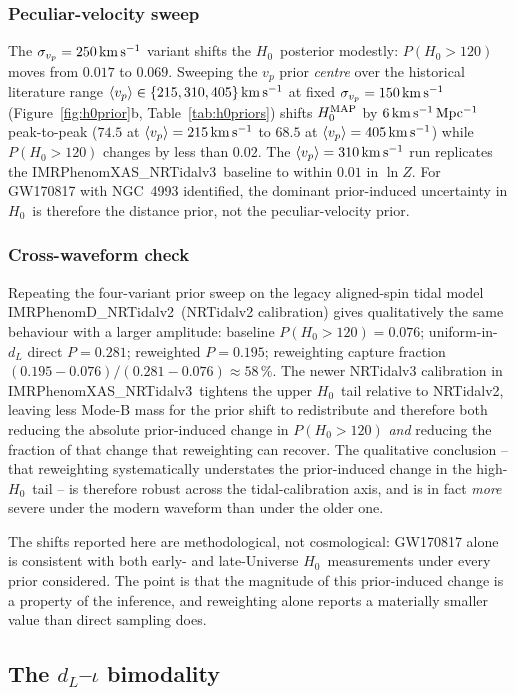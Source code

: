 \documentclass[usenatbib]{mnras}
\newcommand{\kmsmpc}{\ensuremath{\,\rm km\,s^{-1}\,Mpc^{-1}}\xspace}
\newcommand{\kms}{\ensuremath{\,\rm km\,s^{-1}}\xspace}
\newcommand{\hzero}{\ensuremath{H_{0}}\xspace}
\newcommand{\sigmavp}{\ensuremath{\sigma_{v_p}}\xspace}
\newcommand{\IMR}{IMRPhenomD\_NRTidalv2\xspace}
\newcommand{\IMRX}{IMRPhenomXAS\_NRTidalv3\xspace}
\begin{document}
\subsubsection{Peculiar-velocity sweep} The $\sigmavp=250\kms$ variant shifts the \hzero\ posterior modestly: $P(\hzero>120)$ moves from $0.017$ to $0.069$. Sweeping the $v_{p}$ prior \emph{centre} over the historical literature range $\langle v_{p}\rangle\in\{215, 310, 405\}\kms$ at fixed $\sigmavp=150\kms$ (Figure~\ref{fig:h0prior}b, Table~\ref{tab:h0priors}) shifts $\hzero^{\rm MAP}$ by $6\kmsmpc$ peak-to-peak ($74.5$ at $\langle v_{p}\rangle=215\kms$ to $68.5$ at $\langle v_{p}\rangle=405\kms$) while $P(\hzero>120)$ changes by less than $0.02$. The $\langle v_{p}\rangle=310\kms$ run replicates the \IMRX\ baseline to within $0.01$ in $\ln Z$. For GW170817 with NGC~4993 identified, the dominant prior-induced uncertainty in \hzero\ is therefore the distance prior, not the peculiar-velocity prior.

\subsubsection{Cross-waveform check} Repeating the four-variant prior sweep on the legacy aligned-spin tidal model \IMR\ (NRTidalv2 calibration) gives qualitatively the same behaviour with a larger amplitude: baseline $P(\hzero>120)=0.076$; uniform-in-$d_L$ direct $P=0.281$; reweighted $P=0.195$; reweighting capture fraction $(0.195-0.076)/(0.281-0.076)\approx 58\,\%$. The newer NRTidalv3 calibration in \IMRX\ tightens the upper \hzero\ tail relative to NRTidalv2, leaving less Mode-B mass for the prior shift to redistribute and therefore both reducing the absolute prior-induced change in $P(\hzero>120)$ \emph{and} reducing the fraction of that change that reweighting can recover. The qualitative conclusion -- that reweighting systematically understates the prior-induced change in the high-\hzero\ tail -- is therefore robust across the tidal-calibration axis, and is in fact \emph{more} severe under the modern waveform than under the older one.

The shifts reported here are methodological, not cosmological: GW170817 alone is consistent with both early- and late-Universe \hzero\ measurements under every prior considered. The point is that the magnitude of this prior-induced change is a property of the inference, and reweighting alone reports a materially smaller value than direct sampling does.

\subsection{The $d_{L}$--$\iota$ bimodality}
\label{sec:bimodality}
\end{document}

